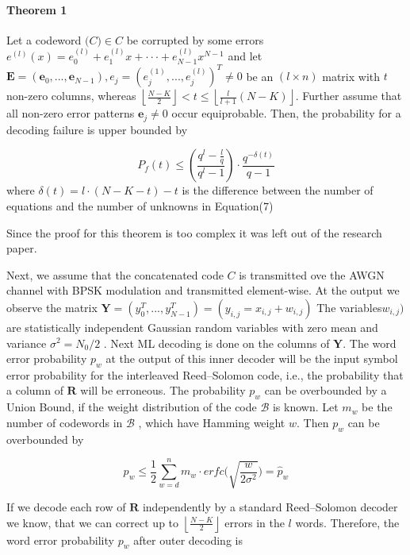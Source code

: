 \documentclass[fontsize=12pt]{article}
\begin{document}
\paragraph{Theorem 1}
Let a codeword $\mathbf(C)\in C$ be corrupted by some
errors $e^{(l)}(x)=e^{(l)}_0+e^{(l)}_1x+\cdot\cdot\cdot+e^{(l)}_{N-1}x^{N-1}$ and let $\mathbf{E}=(\mathbf{e}_0,...,\mathbf{e}_{N-1}), e_j =(e^{(1)}_{j},...,e^{(l)}_{j})^T \neq 0$ be an $(l \times n)$ matrix with $t$ non-zero columns, whereas $ \left \lfloor \frac{N-K}{2} \right \rfloor < t \leq  \left \lfloor \frac{l}{l+1} ({N - K}) \right \rfloor$. Further assume that all non-zero error
patterns 	$\mathbf{e}_j \neq 0 $ occur equiprobable. Then, the probability for
a decoding failure is upper bounded by

$$ P_f(t) \leq (\frac{q^l -\frac{l}{q}}{q^l-1}) \cdot \frac{q^{-\delta(t)}}{q-1} $$
where $\delta(t) = l \cdot (N -K - t) -t$ is the difference between the number of equations and the number of unknowns in Equation(7)

Since the proof for this theorem is too complex it was left out of the research paper.

Next, we assume that the concatenated code $C$  is transmitted ove the AWGN channel
 with BPSK modulation and transmitted element-wise. At the output we observe the matrix $\mathbf{Y}=(y_0^T,...,y_{N-1}^T) = (y_{i,j}= x_{i,j}+w_{i,j})$ 
 The
variables$w_{i,j})$ are statistically independent Gaussian random
variables with zero mean and variance $\sigma^2=N_0/2$
. Next ML decoding is done on the columns of $\mathbf{Y}$. The word error probability $p_w$ at the output of
this inner decoder will be the input symbol error probability
for the interleaved Reed–Solomon code, i.e., the probability
that a column of $\mathbf{R}$ will be erroneous. The probability $p_w$ can
be overbounded by a Union Bound, if the weight distribution
of the code $\mathcal{B}$ is known. Let $m_w$ be the number of codewords
in $\mathcal{B}$
, which have Hamming weight $w$. Then $p_w$ can be
overbounded by

\begin{equation}
p_w \leq \frac{1}{2} \sum_{w=d}^{n} m_w \cdot erfc\Big( \sqrt{\frac{w}{2\sigma^2}}\Big) = \hat{p}_w
\end{equation}

If we decode each row of $\mathbf{R}$ independently by a standard
Reed–Solomon decoder we know, that we can correct up
to $ \left \lfloor \frac{N-K}{2} \right \rfloor $ errors in the $l$ words. Therefore, the word error
probability 
$p_w$ after outer decoding is
\end{document}
